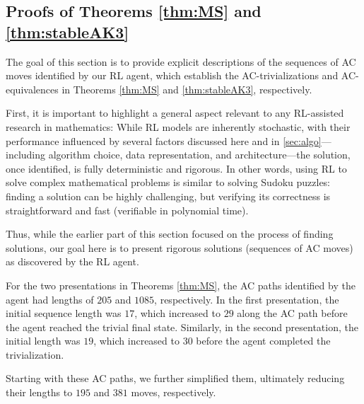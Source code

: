 \subsection{Proofs of Theorems \ref{thm:MS} and \ref{thm:stableAK3}}\label{sec:RLsolutions}

The goal of this section is to provide explicit descriptions of the sequences of AC moves identified by our RL agent, which establish the AC-trivializations and AC-equivalences in Theorems \ref{thm:MS} and \ref{thm:stableAK3}, respectively.

First, it is important to highlight a general aspect relevant to any RL-assisted research in mathematics: While RL models are inherently stochastic, with their performance influenced by several factors discussed here and in \autoref{sec:algo}---including algorithm choice, data representation, and architecture---the solution, once identified, is fully deterministic and rigorous. In other words, using RL to solve complex mathematical problems is similar to solving Sudoku puzzles: finding a solution can be highly challenging, but verifying its correctness is straightforward and fast (verifiable in polynomial time).

Thus, while the earlier part of this section focused on the process of finding solutions, our goal here is to present rigorous solutions (sequences of AC moves) as discovered by the RL agent.

For the two presentations in Theorems \ref{thm:MS}, the AC paths identified by the agent had lengths of $205$ and $1085$, respectively. In the first presentation, the initial sequence length was $17$, which increased to $29$ along the AC path before the agent reached the trivial final state. Similarly, in the second presentation, the initial length was $19$, which increased to $30$ before the agent completed the trivialization.

Starting with these AC paths, we further simplified them, ultimately reducing their lengths to $195$ and $381$ moves, respectively.

